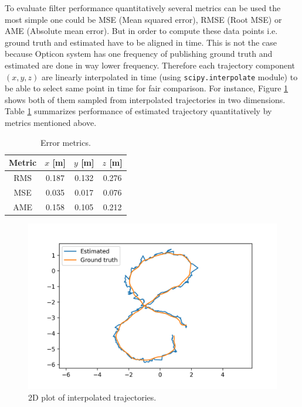 To evaluate filter performance quantitatively several metrics can be used the most simple one could be MSE (Mean squared error), RMSE (Root MSE) or AME (Absolute mean error). But in order to compute these data points i.e. ground truth and estimated have to be aligned in time. This is not the case because Opticon system has one frequency of publishing ground truth and estimated are done in way lower frequency. Therefore each trajectory component $(x,y,z)$ are linearly interpolated in time (using \verb+scipy.interpolate+ module) to be able to select same point in time for fair comparison. For instance, Figure \ref{fig:epx_interp} shows both of them sampled from interpolated trajectories in two dimensions. Table \ref{table:error_matrics} summarizes performance of estimated trajectory quantitatively by metrics mentioned above.
\begin{table}[H]
    \centering
    \begin{tabular}{||c c c c||}
        \hline
        Metric & $x$ [m] & $y$ [m] & $z$ [m] \\ [0.5ex]
        \hline\hline
        RMS    & 0.187   & 0.132   & 0.276   \\
        \hline
        MSE    & 0.035   & 0.017   & 0.076   \\
        \hline
        AME    & 0.158   & 0.105   & 0.212   \\
        \hline
    \end{tabular}
    \caption{Error metrics.}
    \label{table:error_matrics}
\end{table}
\begin{figure}[H]
    \centering
    \includegraphics[width=\linewidth]{figures/interpolated.png}
    \caption{2D plot of interpolated trajectories.}
    \label{fig:epx_interp}
\end{figure}

